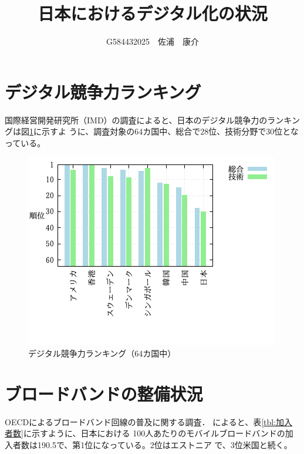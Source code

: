 \documentclass[a4paper,11pt,dvipdfmx]{ujarticle}
\title{日本におけるデジタル化の状況}
\author{G584432025　佐浦　康介}
\begin{document}
\maketitle %

\section{デジタル競争力ランキング   }
国際経営開発研究所（IMD）の調査\cite{IMD}によると、日本のデジタル競争力のランキングは図\ref{fig:順位}に示すよ
うに、調査対象の64カ国中、総合で28位、技術分野で30位となっている。

\begin{figure}[htbp]
    \centering
    \includegraphics[width=0.7\linewidth]{fig41.png}
    \caption{デジタル競争力ランキング（64カ国中）}
    \label{fig:順位}
\end{figure}

\newpage
\section{ブロードバンドの整備状況}
OECDによるブロードバンド回線の普及に関する調査\cite{OECD}．
によると、表\ref{tbl:加入者数}に示すように、日本における 100人あたりのモバイルブロードバンドの加入者数は190.5で、第1位になっている。2位はエストニア
で、3位米国と続く。
\end{document}
